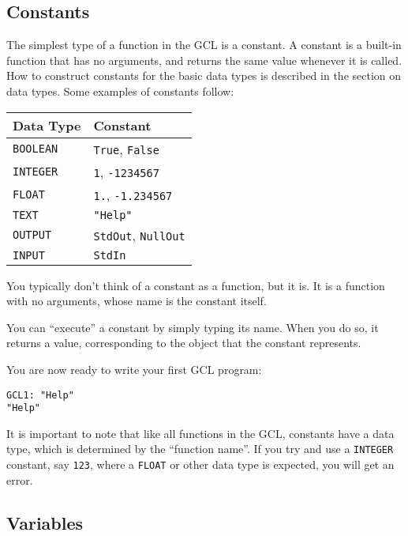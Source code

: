 \subsection{Constants}

The simplest type of a function in the GCL is a constant.  A constant
is a built-in function that has no arguments, and returns the same
value whenever it is called.  How to construct constants for the basic
data types is described in the section on data types.  Some examples
of constants follow:

\medskip
\begin{tabular} {ll} 
Data Type & Constant \\ 
\hline
\verb+BOOLEAN+  & \verb+True+,  \verb+False+ \\
\verb+INTEGER+ & \verb+1+, \verb+-1234567+ \\
\verb+FLOAT+  & \verb+1.+,  \verb+-1.234567+ \\
\verb+TEXT+  & \verb+"Help"+ \\
\verb+OUTPUT+  & \verb+StdOut+, \verb+NullOut+ \\
\verb+INPUT+  & \verb+StdIn+ \\
\end{tabular}
\medskip

You typically don't think of a constant as a function, but it is.  It
is a function with no arguments, whose name is the constant itself.

You can ``execute'' a constant by simply typing its name.  When you do
so, it returns a value, corresponding to the object that the constant
represents.  

You are now ready to write your first GCL program:

\begin{verbatim}
GCL1: "Help"
"Help"
\end{verbatim}

It is important to note that like all functions in the GCL, constants
have a data type, which is determined by the ``function name''.  If
you try and use a \verb+INTEGER+ constant, say \verb+123+, where a
\verb+FLOAT+ or other data type is expected, you will get an error.

\subsection{Variables}

